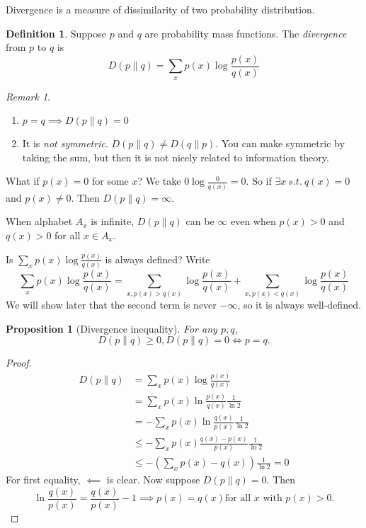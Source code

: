 \documentclass{report}
\newcommand{\st}{\ s.t.\ }
\newtheorem{proposition}{Proposition}[section]
\theoremstyle{definition}
\newtheorem{definition}{Definition}[section]
\theoremstyle{remark}
\newtheorem*{remark}{Remark}
\numberwithin{equation}{section}
\begin{document}
Divergence is a measure of dissimilarity of two probability distribution.
\begin{definition}
  Suppose $p$ and $q$ are probability mass functions. The \emph{divergence} from $p$ to $q$ is \[
    D(p \| q) = \sum_x p(x) \log \frac{p(x)}{q(x)}  
  \]
\end{definition}
\begin{remark}
  \begin{enumerate}
    \item $p = q\implies D(p \| q) = 0$
    \item It is \emph{not symmetric}. $D(p \| q) \neq D(q \| p)$. You can make symmetric by taking the sum, but then it is not nicely related to information theory.
  \end{enumerate}
\end{remark}

What if $p(x) = 0$ for some $x$? We take $0 \log \frac{0}{q(x)} = 0$. So if $\exists x \st q(x) = 0$ and $p(x) \neq 0$. Then $D(p \| q) = \infty$. 

When alphabet $A_x$ is infinite, $D(p \| q)$ can be $\infty$ even when $p(x) > 0$ and $q(x) > 0$ for all $x \in A_x$.

Is $\sum_{x} p(x) \log \frac{p(x)}{q(x)}$ is always defined? Write \[
  \sum_{x} p(x) \log \frac{p(x)}{q(x)} = \sum_{x, p(x) > q(x)}\log \frac{p(x)}{q(x)} + \sum_{x, p(x) < q(x)}\log \frac{p(x)}{q(x)}
\] We will show later that the second term is never $-\infty$, so it is always well-defined.

\begin{proposition}[Divergence inequality]
  For any $p, q$, \[D(p \| q) \geq 0, D(p \| q) = 0 \iff p = q.\]
\end{proposition}
\begin{proof}
  \begin{align*}
    D(p \| q) & = \sum_x p(x) \log \frac{p(x)}{q(x)} \\
    & = \sum_{x} p(x) \ln \frac{p(x)}{q(x)} \frac{1}{\ln 2} \\
    & = -\sum_{x} p(x) \ln \frac{q(x)}{p(x)} \frac{1}{\ln 2} \\
    & \leq -\sum_{x} p(x) \frac{q(x) - p(x)}{p(x)} \frac{1}{\ln 2} \\
    & \leq -\left(\sum_x p(x) - q(x)\right)\frac{1}{\ln 2} = 0
  \end{align*}
  For first equality, $\impliedby$ is clear. Now suppose $D(p \| q) = 0$. Then \[
    \ln \frac{q(x)}{p(x)} = \frac{q(x)}{p(x)} - 1 \implies p(x) = q(x) \text{for all $x$ with $p(x) > 0$}.
  \]
\end{proof}
\end{document}
